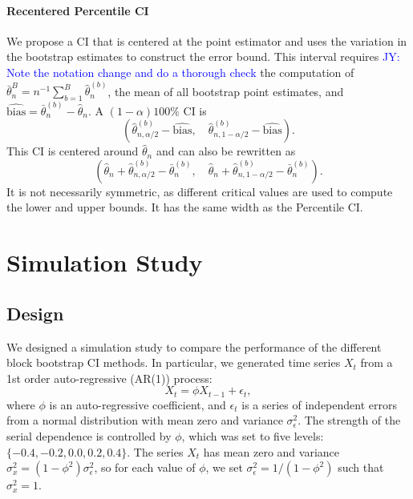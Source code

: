 \documentclass[12pt, letterpaper, titlepage]{article}
\newcommand{\jy}[1]{\textcolor{blue}{JY: #1}}
\begin{document}
\paragraph{Recentered Percentile CI}

We propose a CI that is centered at the point estimator and uses the variation
in the bootstrap estimates to construct the error bound. This interval requires
\jy{Note the notation change and do a thorough check}
the computation of
$\bar\theta_n^B = n^{-1}\sum_{b=1}^B \hat\theta_n^{(b)}$, the mean of all bootstrap point
estimates, and $\widehat{\text{bias}} = \bar\theta_n^{(b)} - \hat\theta_n$. A
$(1 - \alpha)100\%$ CI is
\[
(\hat\theta_{n, \alpha/2}^{(b)} - \widehat{\text{bias}}, \quad
\hat\theta_{n, 1 - \alpha/2}^{(b)} - \widehat{\text{bias}}).
\]
This CI is centered around $\hat\theta_n$ and can also be rewritten
as 
\[
(\hat\theta_n + \hat\theta_{n, \alpha/2}^{(b)} - \bar\theta_n^{(b)}, \quad
\hat\theta_n + \hat\theta_{n, 1 - \alpha/2}^{(b)} - \bar\theta_n^{(b)}).
\]
It is not necessarily symmetric, as different critical values are used to compute
the lower and upper bounds. It has the same width as the Percentile CI.


\section{Simulation Study}
\label{sec:simu}

\subsection{Design}
We designed a simulation study to compare the performance of the different
block bootstrap CI methods. In particular, we generated time series $X_t$ from
a 1st order auto-regressive (AR(1)) process:
\[
X_t = \phi X_{t-1} + \epsilon_t,
\]
where $\phi$ is an auto-regressive coefficient, and $\epsilon_t$ is a series of
independent errors from a normal distribution with mean zero and variance
$\sigma_{\epsilon}^2$. The strength of the serial dependence is controlled by
$\phi$, which was set to five levels: $\{-0.4, -0.2, 0.0, 0.2, 0.4\}$. The
series $X_t$ has mean zero and variance
$\sigma_x^2 = (1 - \phi^2) \sigma_{\epsilon}^2$, so for each value of $\phi$,
we set $\sigma_{\epsilon}^2 = 1 / (1 - \phi^2)$ such that $\sigma_x^2 = 1$.
\end{document}
